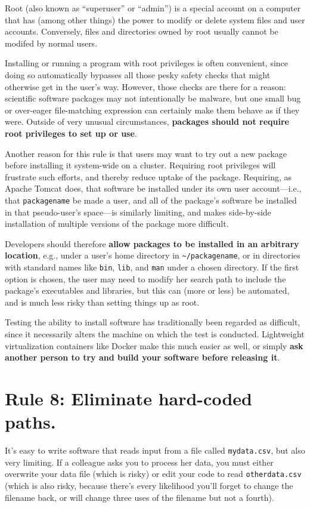 \documentclass[10pt,letterpaper]{article}
\newcommand{\rulemajor}[1]{\section{#1}}
\newcommand{\ruleminor}[1]{\textbf{#1}}
\begin{document}
Root (also known as ``superuser'' or ``admin'') is a special account on
a computer that has (among other things) the power to modify or delete
system files and user accounts. Conversely, files and directories owned
by root usually cannot be modifed by normal users.

Installing or running a program with root privileges is often
convenient, since doing so automatically bypasses all those pesky safety
checks that might otherwise get in the user's way. However, those checks
are there for a reason: scientific software packages may not
intentionally be malware, but one small bug or over-eager file-matching
expression can certainly make them behave as if they were. Outside of
very unusual circumstances,
\ruleminor{packages should not require root privileges to set up or use}.

Another reason for this rule is that users may want to try out a new
package before installing it system-wide on a cluster. Requiring root
privileges will frustrate such efforts, and thereby reduce uptake of the
package. Requiring, as Apache Tomcat does, that software be installed
under its own user account---i.e.,
that \texttt{packagename} be made a user, and all of the
package's software be installed in that pseudo-user's space---is similarly limiting,
and makes side-by-side installation of multiple versions of
the package more difficult.

Developers should therefore
\ruleminor{allow packages to be installed in an arbitrary location},
e.g., under a user's home directory in
\texttt{\textasciitilde{}/packagename}, or in directories with standard
names like \texttt{bin}, \texttt{lib}, and \texttt{man} under a chosen
directory. If the first option is chosen, the user may need to modify
her search path to include the package's executables and libraries, but
this can (more or less) be automated, and is much less risky than
setting things up as root.

Testing the ability to install software has traditionally been regarded as difficult,
since it necessarily alters the machine on which the test is conducted.
Lightweight virtualization containers like Docker make this much easier as well, 
or simply \ruleminor{ask another person to try and build your software before releasing it}.

\rulemajor{Rule 8: Eliminate hard-coded paths.}

It's easy to write software that reads input from a file called
\texttt{mydata.csv}, but also very limiting. If a colleague asks you to
process her data, you must either overwrite your data file (which is
risky) or edit your code to read \texttt{otherdata.csv} (which is also
risky, because there's every likelihood you'll forget to change the
filename back, or will change three uses of the filename but not a
fourth).
\end{document}
